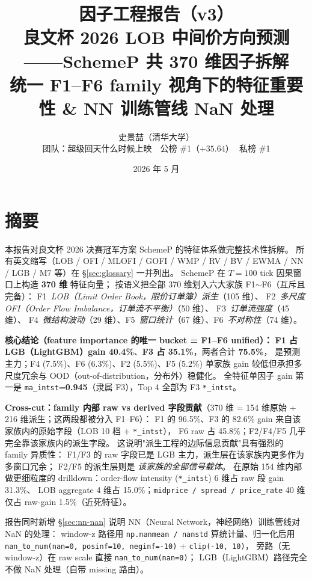 \documentclass[10.5pt,a4paper]{article}
\title{\color{icmlblue}\textbf{因子工程报告（v3）}\\
\large 良文杯 2026 LOB 中间价方向预测——SchemeP 共 370 维因子拆解\\
\normalsize 统一 F1--F6 family 视角下的特征重要性 \& NN 训练管线 NaN 处理}
\author{史景喆（清华大学）\\
\small 团队：超级回天什么时候上映 \,\textbar\, 公榜 \#1（$+35.64$）\,\textbar\, 私榜 \#1}
\date{2026 年 5 月}
\begin{document}
\maketitle

\section{摘要}

本报告对良文杯 2026 决赛冠军方案 SchemeP 的特征体系做完整技术性拆解。
所有英文缩写（LOB / OFI / MLOFI / GOFI / WMP / RV / BV / EWMA / NN / LGB / M7 等）在 §\ref{sec:glossary} 一并列出。
SchemeP 在 $T=100$ tick 因果窗口上构造 \textbf{370 维} 特征向量；
按语义把全部 370 维划入六大家族 F1$\sim$F6（互斥且完备）：
F1~\emph{LOB（Limit Order Book，限价订单簿）派生}（105 维）、
F2~\emph{多尺度 OFI（Order Flow Imbalance，订单流不平衡）}（50 维）、
F3~\emph{订单流强度}（45 维）、
F4~\emph{微结构波动}（29 维）、F5~\emph{窗口统计}（67 维）、F6~\emph{不对称性}（74 维）。

\textbf{核心结论（feature importance 的唯一 bucket = F1--F6 unified）：}
\textbf{F1 占 LGB（LightGBM）gain 40.4\%}、\textbf{F3 占 35.1\%}，两者合计 \textbf{75.5\%}，
是预测主力；F4 (7.5\%)、F6 (6.3\%)、F2 (5.5\%)、F5 (5.2\%) 单家族 gain 较低但承担多尺度冗余与 OOD（out-of-distribution，分布外）稳健化。
全特征单因子 gain 第一是 \texttt{ma\_intst}=\textbf{0.945}（隶属 F3），Top 4 全部为 F3 \texttt{*\_intst}。

\textbf{Cross-cut：family 内部 raw vs derived 字段贡献}（370 维 = 154 维原始 + 216 维派生；这两段都被分入 F1--F6）：
F1 的 96.5\%、F3 的 82.6\% gain 来自该家族内的原始字段（LOB 10 档 + \texttt{*\_intst}），
F6 raw 占 45.8\%；F2/F4/F5 几乎完全靠该家族内的派生字段。
这说明"派生工程的边际信息贡献"具有强烈的 family 异质性：
F1/F3 的 raw 字段已是 LGB 主力，派生层在该家族内更多作为多窗口冗余；
F2/F5 的派生层则是 \emph{该家族的全部信号载体}。
在原始 154 维内部做更细粒度的 drilldown：order-flow intensity (\texttt{*\_intst}) 6 维占 raw 段 gain 31.3\%、
LOB aggregate 4 维占 15.0\%；\texttt{midprice / spread / price\_rate} 40 维仅占 raw-gain 1.5\%（近死特征）。

报告同时新增 §\ref{sec:nn-nan} 说明 NN（Neural Network，神经网络）训练管线对 NaN 的处理：
window-z 路径用 \texttt{np.nanmean / nanstd} 算统计量、归一化后用
\texttt{nan\_to\_num(nan=0, posinf=10, neginf=-10)} + \texttt{clip(-10, 10)}，
旁路（无 window-z）在 raw scale 直接 \texttt{nan\_to\_num(nan=0)}；
LGB（LightGBM）路径完全不做 NaN 处理（自带 missing 路由）。
\end{document}
